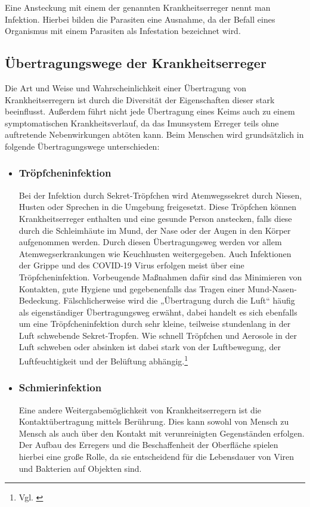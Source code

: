 \documentclass[12pt]{article}
\begin{document}
Eine Ansteckung mit einem der genannten Krankheitserreger nennt man Infektion. Hierbei bilden die Parasiten eine Ausnahme, da der Befall eines Organismus mit einem Parasiten als Infestation bezeichnet wird.

\subsection{Übertragungswege der Krankheitserreger}
Die Art und Weise und Wahrscheinlichkeit einer Übertragung von Krankheitserregern ist durch die Diversität der Eigenschaften dieser stark beeinflusst. Außerdem führt nicht jede Übertragung eines Keims auch zu einem symptomatischen Krankheitsverlauf, da das Imunsystem Erreger teils ohne auftretende Nebenwirkungen abtöten kann. Beim Menschen wird grundsätzlich in folgende Übertragungswege unterschieden:
\begin{itemize}
    \item \subsubsection{Tröpfcheninfektion}\label{sec:Troepfchen}
    Bei der Infektion durch Sekret-Tröpfchen wird Atemwegssekret durch Niesen, Husten oder Sprechen in die Umgebung freigesetzt. Diese Tröpfchen können Krankheitserreger enthalten und eine gesunde Person anstecken, falls diese durch die Schleimhäute im  Mund, der Nase oder der Augen in den Körper aufgenommen werden. Durch diesen Übertragungsweg werden vor allem Atemwegserkrankungen wie Keuchhusten weitergegeben. Auch Infektionen der Grippe und des COVID-19 Virus erfolgen meist über eine Tröpfcheninfektion. Vorbeugende Maßnahmen dafür sind das Minimieren von Kontakten, gute Hygiene und gegebenenfalls das Tragen einer Mund-Nasen-Bedeckung.
    Fälschlicherweise wird die „Übertragung durch die Luft“ häufig als eigenständiger Übertragungsweg erwähnt, dabei handelt es sich ebenfalls um eine Tröpfcheninfektion durch sehr kleine, teilweise stundenlang in der Luft schwebende Sekret-Tropfen. Wie schnell Tröpfchen und Aerosole in der Luft schweben oder absinken ist dabei stark von der Luftbewegung, der Luftfeuchtigkeit und der Belüftung abhängig.\footnote{Vgl. \cite{Rki21}}
    \item \subsubsection{Schmierinfektion}
    Eine andere Weitergabemöglichkeit von Krankheitserregern ist die Kontaktübertragung mittels Berührung. Dies kann sowohl von Mensch zu Mensch als auch über den Kontakt mit verunreinigten Gegenständen erfolgen. Der Aufbau des Erregers und die Beschaffenheit der Oberfläche spielen hierbei eine große Rolle, da sie entscheidend für die Lebensdauer von Viren und Bakterien auf Objekten sind.

\end{itemize}
\end{document}
